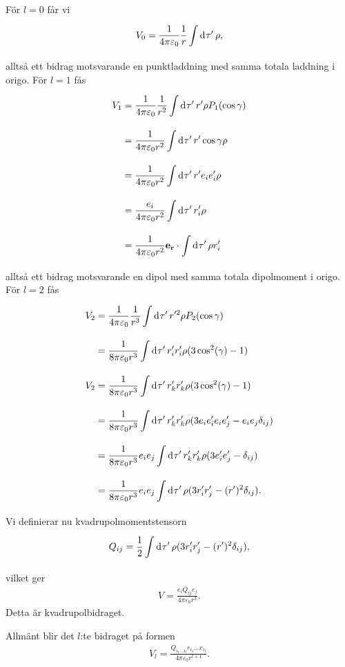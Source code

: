 För $l = 0$ får vi
\begin{align*}
	V_{0} = \frac{1}{4\pi\varepsilon_{0}}\frac{1}{r}\int\limits_{}^{}\dd[]{\tau'}\rho,
\end{align*}
alltså ett bidrag motsvarande en punktladdning med samma totala laddning i origo. För $l = 1$ fås
\begin{align*}
	V_{1} &= \frac{1}{4\pi\varepsilon_{0}}\frac{1}{r^{2}}\int\limits_{}^{}\dd[]{\tau'}r'\rho P_{1}(\cos{\gamma}) \\
	      &= \frac{1}{4\pi\varepsilon_{0}r^{2}}\int\limits_{}^{}\dd[]{\tau'}r'\cos{\gamma}\rho \\
	      &= \frac{1}{4\pi\varepsilon_{0}r^{2}}\int\limits_{}^{}\dd[]{\tau'}r'e_{i}e_{i}'\rho \\
	      &= \frac{e_{i}}{4\pi\varepsilon_{0}r^{2}}\int\limits_{}^{}\dd[]{\tau'}r_{i}'\rho \\
	      &= \frac{1}{4\pi\varepsilon_{0}r^{2}}\vb{e}_{\vb{r}}\cdot\int\limits_{}^{}\dd[]{\tau'}\rho r_{i}'
\end{align*}
alltså ett bidrag motsvarande en dipol med samma totala dipolmoment i origo. För $l = 2$ fås
\begin{align*}
	V_{2} &= \frac{1}{4\pi\varepsilon_{0}}\frac{1}{r^{3}}\int\limits_{}^{}\dd[]{\tau'}r'^{2}\rho P_{2}(\cos{\gamma}) \\
	      &= \frac{1}{8\pi\varepsilon_{0}r^{3}}\int\limits_{}^{}\dd[]{\tau'}r_{i}'r_{i}'\rho(3\cos[2](\gamma) - 1) \\
	V_{2} &= \frac{1}{8\pi\varepsilon_{0}r^{3}}\int\limits_{}^{}\dd[]{\tau'}r_{k}'r_{k}'\rho(3\cos[2](\gamma) - 1)  \\
	      &= \frac{1}{8\pi\varepsilon_{0}r^{3}}\int\limits_{}^{}\dd[]{\tau'}r_{k}'r_{k}'\rho(3e_{i}e_{i}'e_{i}e_{j}' - e_{i}e_{j}\delta_{ij}) \\
	      &= \frac{1}{8\pi\varepsilon_{0}r^{3}}e_{i}e_{j}\int\limits_{}^{}\dd[]{\tau'}r_{k}'r_{k}'\rho(3e_{i}'e_{j}' - \delta_{ij}) \\
	      &= \frac{1}{8\pi\varepsilon_{0}r^{3}}e_{i}e_{j}\int\limits_{}^{}\dd[]{\tau'}\rho(3r_{i}'r_{j}' - (r')^{2}\delta_{ij}).
\end{align*}
Vi definierar nu kvadrupolmomentstensorn
\begin{align*}
	Q_{ij} = \frac{1}{2}\int\limits_{}^{}\dd[]{\tau'}\rho(3r_{i}'r_{j}' - (r')^{2}\delta_{ij}),
\end{align*}
vilket ger
\begin{align*}
	V = \frac{e_{i}Q_{ij}e_{j}}{4\pi\varepsilon_{0}r^{3}}.
\end{align*}
Detta är kvadrupolbidraget.

Allmänt blir det $l$:te bidraget på formen
\begin{align*}
	V_{l} = \frac{Q_{i_{1}\dots i_{l}}e_{i_{1}}\dots e_{i_{l}}}{4\pi\varepsilon_{0}r^{l + 1}}.
\end{align*}


